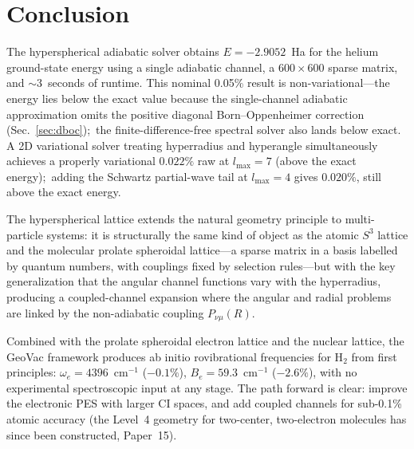\documentclass[aps,pra,twocolumn,superscriptaddress,longbibliography]{revtex4-2}
\begin{document}

\section{Conclusion}
\label{sec:conclusion}

The hyperspherical adiabatic solver obtains $E = -2.9052$~Ha for the
helium ground-state energy using a single adiabatic channel, a
$600 \times 600$ sparse matrix, and $\sim$3~seconds of runtime.
This nominal 0.05\% result is non-variational---the energy lies below
the exact value because the single-channel adiabatic approximation
omits the positive diagonal Born--Oppenheimer correction
(Sec.~\ref{sec:dboc});\ the finite-difference-free spectral solver
also lands below exact.  A 2D variational solver treating
hyperradius and hyperangle simultaneously achieves a properly
variational $0.022\%$ raw at $l_{\max} = 7$ (above the exact
energy);\ adding the Schwartz partial-wave tail at $l_{\max} = 4$
gives $0.020\%$, still above the exact energy.

The hyperspherical lattice extends the natural geometry principle to
multi-particle systems: it is structurally the same kind of object
as the atomic $S^3$ lattice and the molecular prolate spheroidal
lattice---a sparse matrix in a basis labelled by quantum numbers,
with couplings fixed by selection rules---but with the key
generalization
that the angular channel functions vary with the hyperradius,
producing a coupled-channel expansion where the angular and radial
problems are linked by the non-adiabatic coupling $P_{\nu\mu}(R)$.

Combined with the prolate spheroidal electron lattice and the nuclear
lattice, the GeoVac framework produces ab initio rovibrational
frequencies for H$_2$ from first principles: $\omega_e =
4396$~cm$^{-1}$ ($-0.1\%$), $B_e = 59.3$~cm$^{-1}$ ($-2.6\%$),
with no experimental spectroscopic input at any stage.  The path
forward is clear: improve the electronic PES with larger CI spaces,
and add coupled channels for sub-0.1\% atomic accuracy (the Level~4
geometry for two-center, two-electron molecules has since been
constructed, Paper~15).
\end{document}
